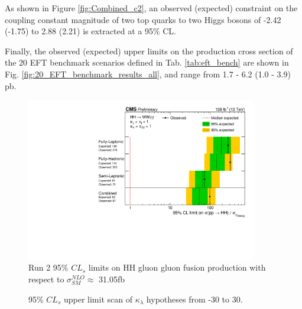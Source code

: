 As shown in Figure \ref{fig:Combined_c2}, an observed (expected) constraint on the coupling constant magnitude of two top quarks to two Higgs bosons of
-2.42 (-1.75) to 2.88 (2.21) is extracted at a 95\% CL.

Finally, the observed (expected) upper limits on the production cross section of the 20 EFT benchmark scenarios defined in Tab. \ref{tab:eft_bench} are shown in 
Fig. \ref{fig:20_EFT_benchmark_results_all}, and range from 1.7 - 6.2 (1.0 - 3.9) pb. 

\begin{figure}[!htbp]
  \centering
  \includegraphics[width=0.9\textwidth]{Images/Results/All_limits.pdf}
  \caption{Run 2 95\% $CL_{s}$ limits on HH gluon gluon fusion production with respect to $\sigma_{SM}^{NLO} \approx $ 31.05fb}
  \label{fig:Run2SMNLOCombined}
\end{figure}

\begin{figure}[!htbp]
  \setcounter{subfigure}{0}
  \centering
  \qquad
  \caption{95\% $CL_{s}$ upper limit scan of $\kappa_{\lambda}$ hypotheses from -30 to 30.}
  \label{fig:kl_scan}
\end{figure}

